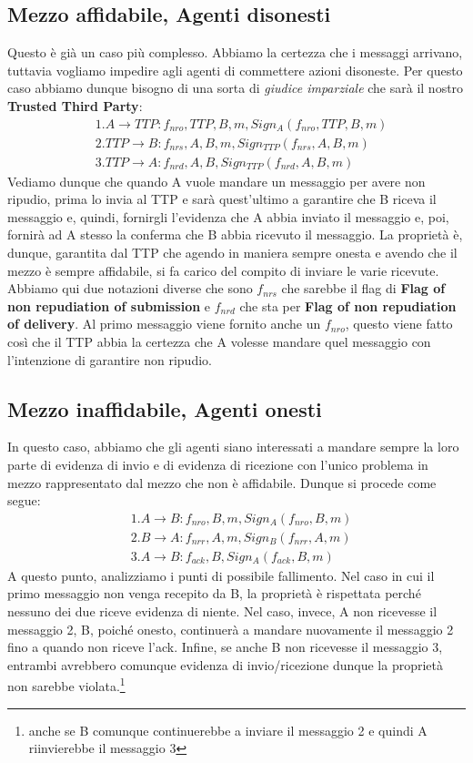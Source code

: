 \subsection{Mezzo affidabile, Agenti disonesti}
Questo è già un caso più complesso. Abbiamo la certezza che i messaggi arrivano, tuttavia vogliamo impedire agli agenti di commettere azioni disoneste. Per questo caso abbiamo dunque bisogno di una sorta di \textit{giudice imparziale} che sarà il nostro \textbf{Trusted Third Party}:
\begin{align*}
    &1. A \to TTP: f_{nro}, TTP, B, m, Sign_A(f_{nro},TTP,B,m)\\
    &2. TTP \to B: f_{nrs},A,B,m,Sign_{TTP}(f_{nrs},A,B,m)\\
    &3. TTP \to A: f_{nrd}, A,B,Sign_{TTP}(f_{nrd},A,B,m)
\end{align*}
Vediamo dunque che quando A vuole mandare un messaggio per avere non ripudio, prima lo invia al TTP e sarà quest'ultimo a garantire che B riceva il messaggio e, quindi, fornirgli l'evidenza che A abbia inviato il messaggio e, poi, fornirà ad A stesso la conferma che B abbia ricevuto il messaggio. La proprietà è, dunque, garantita dal TTP che agendo in maniera sempre onesta e avendo che il mezzo è sempre affidabile, si fa carico del compito di inviare le varie ricevute.
Abbiamo qui due notazioni diverse che sono $f_{nrs}$ che sarebbe il flag di \textbf{Flag of non repudiation of submission} e $f_{nrd}$ che sta per \textbf{Flag of non repudiation of delivery}.
Al primo messaggio viene fornito anche un $f_{nro}$, questo viene fatto così che il TTP abbia la certezza che A volesse mandare quel messaggio con l'intenzione di garantire non ripudio.
\subsection{Mezzo inaffidabile, Agenti onesti}
In questo caso, abbiamo che gli agenti siano interessati a mandare sempre la loro parte di evidenza di invio e di evidenza di ricezione con l'unico problema in mezzo rappresentato dal mezzo che non è affidabile. Dunque si procede come segue:
\begin{align*}
    &1. A \to B: f_{nro},B,m, Sign_A(f_{nro},B,m)\\
    &2. B \to A: f_{nrr}, A ,m, Sign_B(f_{nrr},A,m)\\
    &3. A \to B: f_{ack}, B, Sign_A(f_{ack}, B,m)
\end{align*}
A questo punto, analizziamo i punti di possibile fallimento. Nel caso in cui il primo messaggio non venga recepito da B, la proprietà è rispettata perché nessuno dei due riceve evidenza di niente. Nel caso, invece, A non ricevesse il messaggio 2, B, poiché onesto, continuerà a mandare nuovamente il messaggio 2 fino a quando non riceve l'ack. Infine, se anche B non ricevesse il messaggio 3, entrambi avrebbero comunque evidenza di invio/ricezione dunque la proprietà non sarebbe violata.\footnote{anche se B comunque continuerebbe a inviare il messaggio 2 e quindi A riinvierebbe il messaggio 3}

